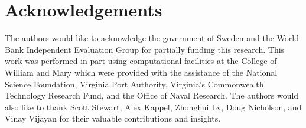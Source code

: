 \documentclass{article}\usepackage[]{graphicx}\usepackage[]{color}
\newenvironment{knitrout}{}{}  %
\begin{document}
\begin{knitrout}
\section{Acknowledgements}
The authors would like to acknowledge the government of Sweden and the World Bank Independent Evaluation Group for partially funding this research.  
This work was performed in part using computational facilities at the College of William and Mary which were provided with the assistance of the National Science Foundation, Virginia Port Authority, Virginia's Commonwealth Technology Research Fund, and the Office of Naval Research.  
The authors would also like to thank Scott Stewart, Alex Kappel, Zhonghui Lv, Doug Nicholson, and Vinay Vijayan for their valuable contributions and insights.


\newpage
\printbibliography



\end{knitrout}
\end{document}
